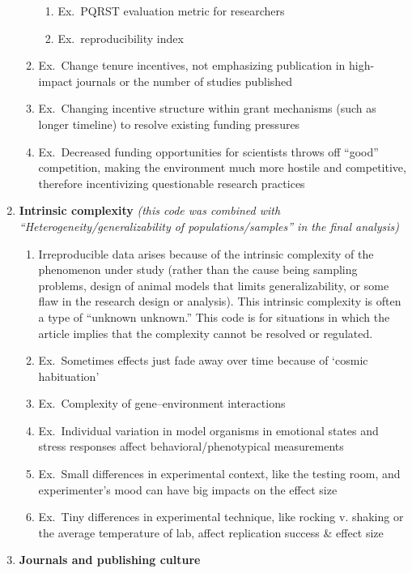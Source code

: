 \documentclass[
]{scrartcl}
\begin{document}
\begin{enumerate}
\begin{enumerate}
\begin{enumerate}
    \item
      Ex.~PQRST evaluation metric for researchers
    \item
      Ex.~reproducibility index
    \end{enumerate}
  \item
    Ex.~Change tenure incentives, not emphasizing publication in
    high-impact journals or the number of studies published
  \item
    Ex.~Changing incentive structure within grant mechanisms (such as
    longer timeline) to resolve existing funding pressures
  \item
    Ex.~Decreased funding opportunities for scientists throws off
    ``good'' competition, making the environment much more hostile and
    competitive, therefore incentivizing questionable research practices
  \end{enumerate}
\item
  \textbf{Intrinsic complexity} \emph{(this code was combined with
  ``Heterogeneity/generalizability of populations/samples'' in the final
  analysis)}

  \begin{enumerate}

  \item
    Irreproducible data arises because of the intrinsic complexity of
    the phenomenon under study (rather than the cause being sampling
    problems, design of animal models that limits generalizability, or
    some flaw in the research design or analysis). This intrinsic
    complexity is often a type of ``unknown unknown.'' This code is for
    situations in which the article implies that the complexity cannot
    be resolved or regulated.
  \item
    Ex.~Sometimes effects just fade away over time because of `cosmic
    habituation'
  \item
    Ex.~Complexity of gene--environment interactions
  \item
    Ex.~Individual variation in model organisms in emotional states and
    stress responses affect behavioral/phenotypical measurements
  \item
    Ex.~Small differences in experimental context, like the testing
    room, and experimenter's mood can have big impacts on the effect
    size
  \item
    Ex.~Tiny differences in experimental technique, like rocking v.
    shaking or the average temperature of lab, affect replication
    success \& effect size
  \end{enumerate}
\item
  \textbf{Journals and publishing culture}


\end{enumerate}
\end{document}
